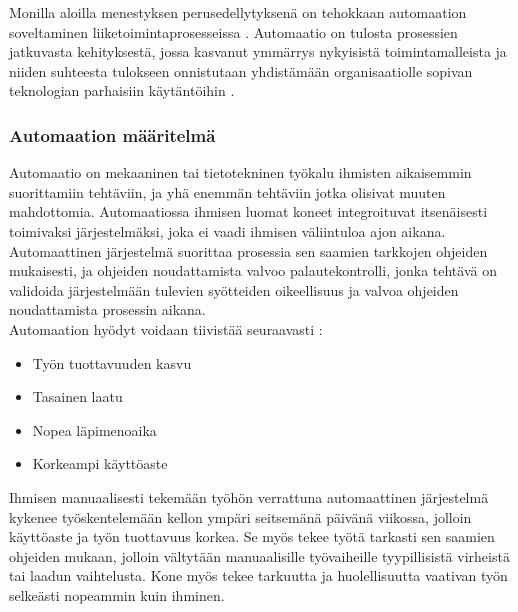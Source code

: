 \documentclass[finnish,12pt,a4paper,pdftex]{article}
\begin{document}
Monilla aloilla menestyksen perusedellytyksenä on tehokkaan automaation soveltaminen liiketoimintaprosesseissa \citep{teollisuustalous}. Automaatio on tulosta prosessien jatkuvasta kehityksestä, jossa kasvanut ymmärrys nykyisistä toimintamalleista ja niiden suhteesta tulokseen onnistutaan yhdistämään organisaatiolle sopivan teknologian parhaisiin käytäntöihin \citep{clarkin}. 




\subsubsection{Automaation määritelmä}

Automaatio on mekaaninen tai tietotekninen työkalu ihmisten aikaisemmin suorittamiin tehtäviin, ja yhä enemmän tehtäviin jotka olisivat muuten mahdottomia. Automaatiossa ihmisen luomat koneet integroituvat itsenäisesti toimivaksi järjestelmäksi, joka ei vaadi ihmisen väliintuloa ajon aikana. Automaattinen järjestelmä suorittaa prosessia sen saamien tarkkojen ohjeiden mukaisesti, ja ohjeiden noudattamista valvoo palautekontrolli, jonka tehtävä on validoida järjestelmään tulevien syötteiden oikeellisuus ja valvoa ohjeiden noudattamista prosessin aikana. \citep{groover} \\

Automaation hyödyt voidaan tiivistää seuraavasti \citep{groover, teollisuustalous}:

\begin{itemize}
\setlength{\itemsep}{0pt}
    \item Työn tuottavuuden kasvu
    \item Tasainen laatu
    \item Nopea läpimenoaika
    \item Korkeampi käyttöaste
\end{itemize}

\noindent Ihmisen manuaalisesti tekemään työhön verrattuna automaattinen järjestelmä kykenee työskentelemään kellon ympäri seitsemänä päivänä viikossa, jolloin käyttöaste ja työn tuottavuus korkea. Se myös tekee työtä tarkasti sen saamien ohjeiden mukaan, jolloin vältytään manuaalisille työvaiheille tyypillisistä virheistä tai laadun vaihtelusta. Kone myös tekee tarkuutta ja huolellisuutta vaativan työn selkeästi nopeammin kuin ihminen. \citep{groover}\\
\end{document}
